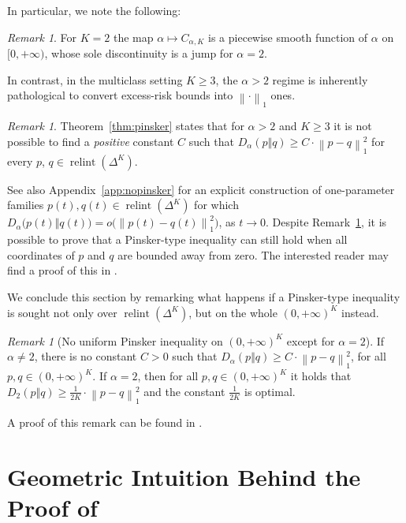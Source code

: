 \documentclass[11pt,oneside,a4paper]{article}
\newcommand{\lrb}[1]{\left(#1\right)}
\newcommand{\brb}[1]{\bigl(#1\bigr)}
\newcommand{\lno}[1]{\left\lVert#1\right\rVert}
\theoremstyle{plain}
\theoremstyle{definition}
\theoremstyle{remark}
\newtheorem{remark}[theorem]{Remark}
\newcommand{\simplex}[1]{\Delta^{#1}}
\DeclareMathOperator*{\relint}{relint}
\begin{document}
In particular, we note the following:
\begin{remark}
For $K = 2$ the map $\alpha \mapsto C_{\alpha, K}$ is a piecewise smooth function of $\alpha$ on $[0, +\infty)$, whose sole discontinuity is a jump for $\alpha = 2$.
\end{remark}
In contrast, in the multiclass setting $K\ge 3$, the $\alpha>2$ regime is inherently pathological to convert excess-risk bounds into $\lno{\cdot}_1$ ones.
\begin{remark}\label{rem:no-pinsker-K-ge-3}
    Theorem~\ref{thm:pinsker} states that for $\alpha >2$ and $K \geq 3$ it is not possible to find a \emph{positive} constant $C$ such that $D_\alpha(p\Vert q) \ge C\cdot
    \lno{ p-q }_1^2$ for every $p$, $q \in \relint{\lrb{\simplex{K}}}$.
\end{remark}
See also Appendix~\ref{app:nopinsker} for an explicit construction of one-parameter families $p(t),q(t)\in \relint(\simplex{K})$ for which $D_\alpha\brb{p(t)\Vert q(t)}=o\brb{\lno{p(t)-q(t)}_1^2}$, as $t \to 0$.
Despite Remark~\ref{rem:no-pinsker-K-ge-3}, it is possible to prove that a Pinsker-type inequality can still hold when all coordinates of $p$ and $q$ are bounded away from zero. The interested reader may find a proof of this in .

We conclude this section by remarking what happens if a Pinsker-type inequality is sought not only over $\relint{\lrb{\simplex{K}}}$, but on the whole $(0,+\infty)^K$ instead.
\begin{remark}[No uniform Pinsker inequality on $(0,+\infty)^K$ except for $\alpha=2$]
\label{rem:nopinsker-orthant}
If $\alpha\neq 2$, there is no constant $C>0$ such that
$D_\alpha(p\Vert q)\ge C\cdot \lno{p-q}_1^2$, for all $p,q\in(0,+\infty)^K$. If $\alpha = 2$, then for all $p,q\in(0,+\infty)^K$ it holds that $D_2(p \Vert q) \ge \frac{1}{2K} \cdot \lno{p-q}_1^2$ and the constant $\frac{1}{2K}$ is optimal.

A proof of this remark can be found in .
\end{remark}
\section{Geometric Intuition Behind the Proof of \texorpdfstring{}{Theorem \ref{thm:pinsker}}}
\label{sec:proof_Pinsker_new}
\end{document}
